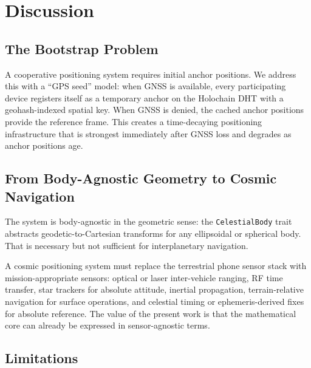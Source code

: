 \documentclass[12pt,a4paper]{article}
\begin{document}
\section{Discussion}

\subsection{The Bootstrap Problem}

A cooperative positioning system requires initial anchor positions. We address this with a ``GPS seed'' model: when GNSS is available, every participating device registers itself as a temporary anchor on the Holochain DHT with a geohash-indexed spatial key. When GNSS is denied, the cached anchor positions provide the reference frame. This creates a time-decaying positioning infrastructure that is strongest immediately after GNSS loss and degrades as anchor positions age.

\subsection{From Body-Agnostic Geometry to Cosmic Navigation}

The system is body-agnostic in the geometric sense: the \texttt{CelestialBody} trait abstracts geodetic-to-Cartesian transforms for any ellipsoidal or spherical body. That is necessary but not sufficient for interplanetary navigation.

A cosmic positioning system must replace the terrestrial phone sensor stack with mission-appropriate sensors: optical or laser inter-vehicle ranging, RF time transfer, star trackers for absolute attitude, inertial propagation, terrain-relative navigation for surface operations, and celestial timing or ephemeris-derived fixes for absolute reference. The value of the present work is that the mathematical core can already be expressed in sensor-agnostic terms.

\subsection{Limitations}
\end{document}
